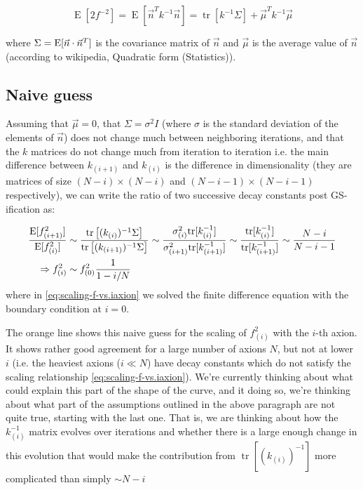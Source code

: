 \documentclass[11pt]{article}
\begin{document}
\begin{equation}
    \label{eq:f-matrix-stats}
     \displaystyle \operatorname {E}[2f^{-2}] = \displaystyle \operatorname {E} \left[\vec{n} ^{T} k^{-1} \vec{n} \right]=\operatorname {tr} \left[k^{-1} \Sigma \right]+\vec{\mu} ^{T} k^{-1} \vec{\mu}
\end{equation}

\noindent where $\Sigma = {\rm E}[\vec{n}\cdot \vec{n}^T]$ is the covariance matrix of $\vec{n}$ and $\vec{\mu}$ is the average value of $\vec{n}$ (according to wikipedia, Quadratic form (Statistics)). 

\subsection{Naive guess}

Assuming that $\vec{\mu}=0$, that $\Sigma = \sigma^2 I$ (where $\sigma$ is the standard deviation of the elements of $\vec n$) does not change much between neighboring iterations, and that the $k$ matrices do not change much from iteration to iteration i.e. the main difference between $k_{(i+1)}$ and $k_{(i)}$ is the difference in dimensionality (they are matrices of size $(N-i)\times (N-i)$ and $(N-i-1)\times (N-i-1)$ respectively), we can write the ratio of two successive decay constants post GS-ification as:

\begin{align}
    \frac{{\rm E}[f_{(i+1)}^2]}{{\rm E}[f_{(i)}^2]} & \sim \frac{ \operatorname {tr} \left[(k_{(i)})^{-1} \Sigma \right]}{\operatorname {tr} \left[(k_{(i+1)})^{-1} \Sigma \right]} \sim \frac{\sigma_{(i)}^2{\rm tr}[k_{(i)}^{-1}]}{\sigma_{(i + 1)}^2{\rm tr}[k_{(i+1)}^{-1}]}\sim \frac{{\rm tr}[k_{(i)}^{-1}]}{{\rm tr}[k_{(i+1)}^{-1}]}\sim \frac{N-i}{N-i-1} \\
    \Rightarrow f_{(i)}^2 & \sim f_{(0)}^2\frac{1}{1-i/N} \label{eq:scaling-f-vs.iaxion}
\end{align}
where in \cref{eq:scaling-f-vs.iaxion} we solved the finite difference equation with the boundary condition at $i = 0$.

The orange line shows this naive guess for the scaling of $f_{(i)}^2$ with the $i$-th axion. It shows rather good agreement for a large number of axions $N$, but not at lower $i$ (i.e. the heaviest axions ($i\ll N$) have decay constants which do not satisfy the scaling relationship \cref{eq:scaling-f-vs.iaxion}). We're currently thinking about what could explain this part of the shape of the curve, and it doing so, we're thinking about what part of the assumptions outlined in the above paragraph are not quite true, starting with the last one. That is, we are thinking about how the $k^{-1}_{(i)}$ matrix evolves over iterations and whether there is a large enough change in this evolution that would make the contribution from $\operatorname {tr} \left[(k_{(i)})^{-1}\right]$ more complicated than simply $\sim N-i$
\end{document}
